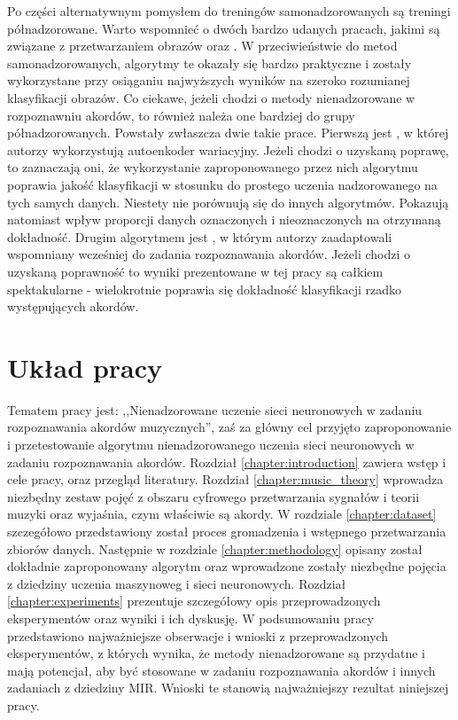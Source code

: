 Po części alternatywnym pomysłem do treningów samonadzorowanych są treningi półnadzorowane. Warto wspomnieć o dwóch bardzo udanych pracach, jakimi są związane z przetwarzaniem obrazów \cite{xie_self-training_2020} oraz \cite{pham_meta_2021}. W przeciwieństwie do metod samonadzorowanych, algorytmy te okazały się bardzo praktyczne i zostały wykorzystane przy osiąganiu najwyższych wyników na szeroko rozumianej klasyfikacji obrazów. Co ciekawe, jeżeli chodzi o metody nienadzorowane w rozpoznawniu akordów, to również należa one bardziej do grupy półnadzorowanych. Powstały zwłaszcza dwie takie prace. Pierwszą jest \cite{wu_semi-supervised_2020}, w której autorzy wykorzystują autoenkoder wariacyjny. Jeżeli chodzi o uzyskaną poprawę, to zaznaczają oni, że wykorzystanie zaproponowanego przez nich algorytmu poprawia jakość klasyfikacji w stosunku do prostego uczenia nadzorowanego na tych samych danych. Niestety nie porównują się do innych algorytmów. Pokazują natomiast wpływ proporcji danych oznaczonych i nieoznaczonych na otrzymaną dokładność. Drugim algorytmem jest \cite{bortolozzo_improving_2021}, w którym autorzy zaadaptowali wspomniany wcześniej \cite{xie_self-training_2020} do zadania rozpoznawania akordów. Jeżeli chodzi o uzyskaną poprawność to wyniki prezentowane w tej pracy są całkiem spektakularne - wielokrotnie poprawia się dokładność klasyfikacji rzadko występujących akordów.



\section{Układ pracy}

Tematem pracy jest: ,,Nienadzorowane uczenie sieci neuronowych w zadaniu rozpoznawania akordów muzycznych'', zaś za główny cel przyjęto zaproponowanie i przetestowanie algorytmu nienadzorowanego uczenia sieci neuronowych w zadaniu rozpoznawania akordów. Rozdział \ref{chapter:introduction} zawiera wstęp i cele pracy, oraz przegląd literatury. Rozdział \ref{chapter:music_theory} wprowadza niezbędny zestaw pojęć z obszaru cyfrowego przetwarzania sygnałów i teorii muzyki oraz wyjaśnia, czym właściwie są akordy. W rozdziale \ref{chapter:dataset} szczegółowo przedstawiony został proces gromadzenia i wstępnego przetwarzania zbiorów danych. Następnie w rozdziale \ref{chapter:methodology} opisany został dokładnie zaproponowany algorytm oraz wprowadzone zostały niezbędne pojęcia z dziedziny uczenia maszynoweg i sieci neuronowych. Rozdział \ref{chapter:experiments} prezentuje szczegółowy opis przeprowadzonych eksperymentów oraz wyniki i ich dyskusję. W podsumowaniu pracy przedstawiono najważniejsze obserwacje i wnioski z przeprowadzonych eksperymentów, z których wynika, że metody nienadzorowane są przydatne i mają potencjał, aby być stosowane w zadaniu rozpoznawania akordów i innych zadaniach z dziedziny MIR. Wnioski te stanowią najważniejszy rezultat niniejszej pracy.
